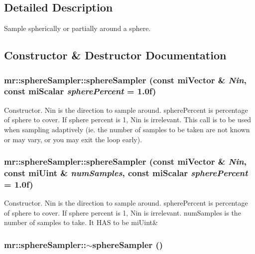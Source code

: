 \subsection{Detailed Description}
Sample spherically or partially around a sphere. 



\subsection{Constructor \& Destructor Documentation}
\subsubsection{\setlength{\rightskip}{0pt plus 5cm}mr::sphere\-Sampler::sphere\-Sampler (const mi\-Vector \& {\em Nin}, const mi\-Scalar {\em sphere\-Percent} = 1.0f)\hspace{0.3cm}{\tt  [inline]}}\label{classmr_1_1sphereSampler_a0}


Constructor. Nin is the direction to sample around. sphere\-Percent is percentage of sphere to cover. If sphere percent is 1, Nin is irrelevant. This call is to be used when sampling adaptively (ie. the number of samples to be taken are not known or may vary, or you may exit the loop early). 
\subsubsection{\setlength{\rightskip}{0pt plus 5cm}mr::sphere\-Sampler::sphere\-Sampler (const mi\-Vector \& {\em Nin}, const mi\-Uint \& {\em num\-Samples}, const mi\-Scalar {\em sphere\-Percent} = 1.0f)\hspace{0.3cm}{\tt  [inline]}}\label{classmr_1_1sphereSampler_a1}


Constructor. Nin is the direction to sample around. sphere\-Percent is percentage of sphere to cover. If sphere percent is 1, Nin is irrelevant. num\-Samples is the number of samples to take. It HAS to be mi\-Uint\& 
\subsubsection{\setlength{\rightskip}{0pt plus 5cm}mr::sphere\-Sampler::$\sim${\bf sphere\-Sampler} ()\hspace{0.3cm}{\tt  [inline]}}\label{classmr_1_1sphereSampler_a2}


